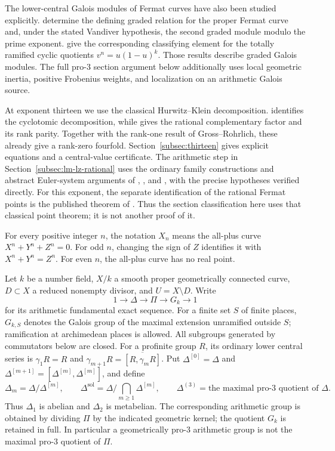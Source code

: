 \documentclass[11pt]{article}
\newcommand{\sol}{\mathrm{sol}}
\theoremstyle{definition}
\begin{document}
The lower-central Galois modules of Fermat curves have also been studied
explicitly. \citet[Theorem~1.1 and Corollary~1.2; author version,
pp.~2--3]{DavisPriesWickelgren2024} determine the defining graded
relation for the proper Fermat curve and, under the stated Vandiver
hypothesis, the second graded module modulo the prime exponent.
\citet[Theorem~A, equivalently Theorem~3.5]{DuqueRoseroPries2024}
give the corresponding classifying element for the totally ramified
cyclic quotients $v^n=u(1-u)^k$.
Those results describe graded Galois modules. The full pro-$3$ section
argument below additionally uses local geometric inertia, positive
Frobenius weights, and localization on an arithmetic Galois source.

At exponent thirteen we use the classical Hurwitz--Klein decomposition.
\citet[Theorem~6.2 and Corollary~6.3, pp.~89--90]{Lim1992}
identifies the cyclotomic decomposition, while
\citet[Proposition~2.1 and Corollary~2.2, p.~942]{Tzermias2004}
gives the rational complementary factor and its rank parity.
Together with the rank-one result of Gross--Rohrlich, these already
give a rank-zero fourfold. Section~\ref{subsec:thirteen} gives explicit
equations and a central-value certificate. The arithmetic step in
Section~\ref{subsec:lm-lz-rational} uses the ordinary family constructions
and abstract Euler-system arguments of \citet{LoefflerZerbes2025},
\citet{LoefflerRockwoodZerbes2024}, and \citet{LoefflerZerbes2026},
with the precise \citet{MazurRubin2004} hypotheses verified directly.
For this exponent, the separate identification of the rational Fermat
points is the published theorem of
\citet[Theorem~0.5, p.~448]{Wiles1995}. Thus the section classification
here uses that classical point theorem; it is not another proof of it.

For every positive integer $n$, the notation $X_n$ means the all-plus
curve $X^n+Y^n+Z^n=0$. For odd $n$, changing the sign of $Z$ identifies
it with $X^n+Y^n=Z^n$. For even $n$, the all-plus curve has no real point.

Let $k$ be a number field, $X/k$ a smooth proper geometrically connected
curve, $D\subset X$ a reduced nonempty divisor, and $U=X\setminus D$.
Write
\[
1\longrightarrow\Delta\longrightarrow\Pi\longrightarrow G_k
\longrightarrow1
\]
for its arithmetic fundamental exact sequence. For a finite set $S$ of finite places, $G_{k,S}$ denotes the Galois
group of the maximal extension unramified outside $S$; ramification at
archimedean places is allowed. All subgroups generated
by commutators below are closed. For a profinite group $R$, its ordinary
lower central series is $\gamma_1R=R$ and
$\gamma_{m+1}R=\overline{[R,\gamma_mR]}$. Put $\Delta^{[0]}=\Delta$ and
$\Delta^{[m+1]}=[\Delta^{[m]},\Delta^{[m]}]$, and define
\[
\Delta_m=\Delta/\Delta^{[m]},\qquad
\Delta^{\sol}=\Delta/\bigcap_{m\geq1}\Delta^{[m]},\qquad
\Delta^{(3)}=\text{the maximal pro-$3$ quotient of }\Delta.
\]
Thus $\Delta_1$ is abelian and $\Delta_2$ is metabelian.
The corresponding arithmetic group is obtained by dividing $\Pi$ by
the indicated geometric kernel; the quotient $G_k$ is retained in full.
In particular a geometrically pro-$3$ arithmetic group is not the maximal
pro-$3$ quotient of $\Pi$.
\end{document}
